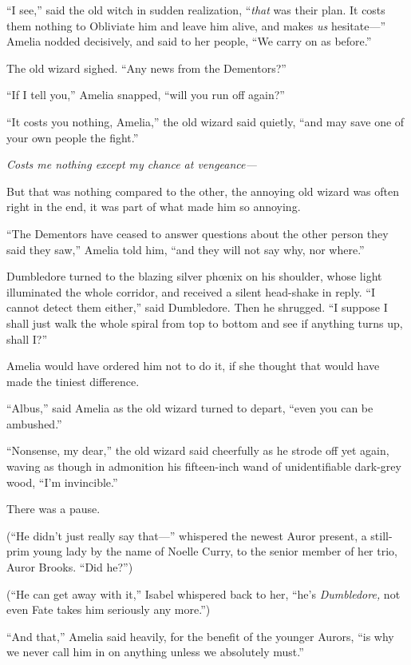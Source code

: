 “I see,” said the old witch in sudden realization, “\emph{that} was their plan. It costs them nothing to Obliviate him and leave him alive, and makes \emph{us} hesitate—” Amelia nodded decisively, and said to her people,
“We carry on as before.”

The old wizard sighed.
“Any news from the Dementors?”

“If I tell you,” Amelia snapped, “will you run off again?”

“It costs you nothing, Amelia,” the old wizard said quietly, “and may save one of your own people the fight.”

\emph{Costs me nothing except my chance at vengeance—}

But that was nothing compared to the other, the annoying old wizard was often right in the end, it was part of what made him so annoying.

“The Dementors have ceased to answer questions about the other person they said they saw,” Amelia told him, “and they will not say why, nor where.”

Dumbledore turned to the blazing silver phœnix on his shoulder, whose light illuminated the whole corridor, and received a silent head-shake in reply.
“I cannot detect them either,” said Dumbledore. Then he shrugged.
“I suppose I shall just walk the whole spiral from top to bottom and see if anything turns up, shall I?”

Amelia would have ordered him not to do it, if she thought that would have made the tiniest difference.

“Albus,” said Amelia as the old wizard turned to depart, “even you can be ambushed.”

“Nonsense, my dear,” the old wizard said cheerfully as he strode off yet again, waving as though in admonition his fifteen-inch wand of unidentifiable dark-grey wood,
“I’m invincible.”

There was a pause.

(“He didn’t just really say that—” whispered the newest Auror present, a still-prim young lady by the name of Noelle Curry, to the senior member of her trio, Auror Brooks.
“Did he?”)

(“He can get away with it,” Isabel whispered back to her, “he’s \emph{Dumbledore,} not even Fate takes him seriously any more.”)

“And that,” Amelia said heavily, for the benefit of the younger Aurors, “is why we never call him in on anything unless we absolutely must.”

\later

